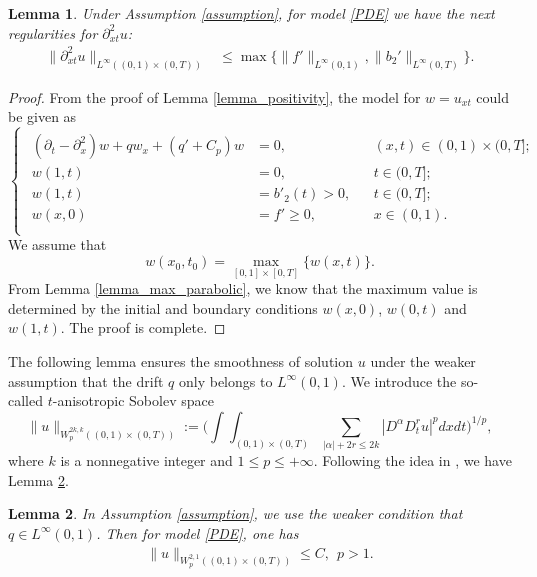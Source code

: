 \documentclass[11pt]{article}
\newtheorem{lemma}{Lemma}[section]
\numberwithin{equation}{section}
\begin{document}
\begin{lemma}\label{lemma_regularity}
Under Assumption \ref{assumption}, for model \eqref{PDE} we have the next regularities for  $\partial^2_{xt}u$:
\begin{align*}
 \|\partial ^2_{xt}u\|_{L^\infty((0,1)\times(0,T))}&\le \max\bigg\{\|f'\|_{L^\infty(0,1)},\|b_2'\|_{L^\infty(0,T)}\bigg\}.
\end{align*}
\end{lemma}
\begin{proof}
From the proof of Lemma \ref{lemma_positivity}, the model for $w=u_{xt}$ could be given as 
\begin{equation*}
 \begin{cases}
  \begin{aligned}
   (\partial_t-\partial_x^2)w+qw_x+(q'+C_p)w&=0, &&(x,t)\in(0,1)\times(0,T];\\
   w(1,t)&=0,&&t\in(0,T];\\
   w(1,t)&=b'_2(t)>0,&&t\in(0,T];\\
   w(x,0)&=f'\ge 0,&&x\in(0,1).\\
  \end{aligned}
 \end{cases}
\end{equation*}
We assume that 
$$w(x_0,t_0)=\max_{[0,1]\times[0,T]}\{w(x,t)\}.$$
From Lemma \ref{lemma_max_parabolic}, we know that the maximum value is determined by the initial and boundary conditions $w(x,0)$, $w(0,t)$ and $w(1,t)$. The proof is complete.
\end{proof}

The following lemma ensures the smoothness of solution $u$ under the weaker assumption that the drift $q$ only belongs to $L^\infty(0,1)$.  We introduce the so-called $t$-anisotropic Sobolev space 
$$\|u\|_{W_p^{2k,k}((0,1)\times(0,T))}:=\bigg(\int\int_{(0,1)\times(0,T)}\sum_{|\alpha|+2r\leq2k}|D^\alpha D_t^ru|^pdxdt\bigg)^{1/p},$$ 
where $k$ is a nonnegative integer and $1\le p \le +\infty$. Following the idea in \cite[subsection 9.2.2]{Wu:2006}, we have Lemma \ref{lemma_smooth}.
\begin{lemma}\label{lemma_smooth}
In Assumption \ref{assumption}, we use the weaker condition that $q\in{L^\infty}(0,1)$. Then for model
\eqref{PDE}, 
one has
\begin{equation}
\begin{aligned}\nonumber
\|u\|_{W_p^{2,1}((0,1)\times(0,T))}\leq C,~~p>1.   
\end{aligned}
\end{equation}
\end{lemma}
\end{document}
